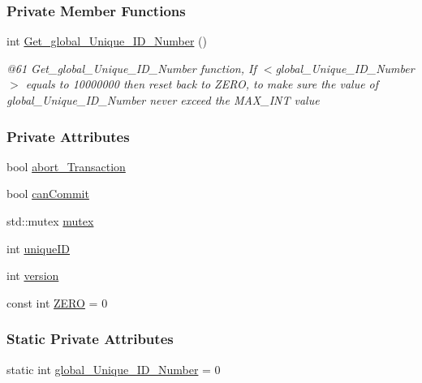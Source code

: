 \subsubsection*{Private Member Functions}
\begin{DoxyCompactItemize}
\item 
int \hyperlink{class_o_s_t_m_adee6903c1100e0d78640bd4b85e5d7df_adee6903c1100e0d78640bd4b85e5d7df}{Get\+\_\+global\+\_\+\+Unique\+\_\+\+I\+D\+\_\+\+Number} ()
\begin{DoxyCompactList}\small\item\em @61 Get\+\_\+global\+\_\+\+Unique\+\_\+\+I\+D\+\_\+\+Number function, If $<$global\+\_\+\+Unique\+\_\+\+I\+D\+\_\+\+Number$>$ equals to 10000000 then reset back to Z\+E\+RO, to make sure the value of global\+\_\+\+Unique\+\_\+\+I\+D\+\_\+\+Number never exceed the M\+A\+X\+\_\+\+I\+NT value \end{DoxyCompactList}\end{DoxyCompactItemize}
\subsubsection*{Private Attributes}
\begin{DoxyCompactItemize}
\item 
bool \hyperlink{class_o_s_t_m_a5121d9c4b08320b26beca82ba2f85c4a_a5121d9c4b08320b26beca82ba2f85c4a}{abort\+\_\+\+Transaction}
\item 
bool \hyperlink{class_o_s_t_m_a2a5b89641af274ddc69bdf8c1c1a07d6_a2a5b89641af274ddc69bdf8c1c1a07d6}{can\+Commit}
\item 
std\+::mutex \hyperlink{class_o_s_t_m_aaab0921fd1564b793f882a5002ec7106_aaab0921fd1564b793f882a5002ec7106}{mutex}
\item 
int \hyperlink{class_o_s_t_m_aa9fe59368b701af7f70befa23bd6901a_aa9fe59368b701af7f70befa23bd6901a}{unique\+ID}
\item 
int \hyperlink{class_o_s_t_m_a9a6ea36181be2db7f9082d77956511d7_a9a6ea36181be2db7f9082d77956511d7}{version}
\item 
const int \hyperlink{class_o_s_t_m_a0bb6ae8411d25f8e7b82d0a61729ea89_a0bb6ae8411d25f8e7b82d0a61729ea89}{Z\+E\+RO} = 0
\end{DoxyCompactItemize}
\subsubsection*{Static Private Attributes}
\begin{DoxyCompactItemize}
\item 
static int \hyperlink{class_o_s_t_m_acb617b9666d198c0de333c8613df0d4b_acb617b9666d198c0de333c8613df0d4b}{global\+\_\+\+Unique\+\_\+\+I\+D\+\_\+\+Number} = 0
\end{DoxyCompactItemize}


